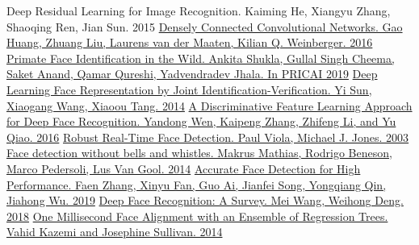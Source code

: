 \documentclass[a4paper,14pt]{extarticle}
\begin{document}
\begin{thebibliography}{0}
        {Deep Residual Learning for Image Recognition. Kaiming He, Xiangyu Zhang, Shaoqing Ren, Jian Sun. 2015}
        \hypertarget{densenet}{}
        \href{https://arxiv.org/abs/1608.06993}
        {Densely Connected Convolutional Networks. Gao Huang, Zhuang Liu, Laurens van der Maaten, Kilian Q. Weinberger. 2016}
        \hypertarget{pfid}{}
        \href{https://arxiv.org/abs/1907.02642}
        {Primate Face Identification in the Wild. Ankita Shukla, Gullal Singh Cheema, Saket Anand, Qamar Qureshi, Yadvendradev Jhala. In PRICAI 2019}
        \hypertarget{pfid2}{}
        \href{https://arxiv.org/abs/1406.4773}
        {Deep Learning Face Representation by Joint Identification-Verification. Yi Sun, Xiaogang Wang, Xiaoou Tang. 2014}
        \hypertarget{pfid3}{}
        \href{https://ydwen.github.io/papers/WenECCV16.pdf}
        {A Discriminative Feature Learning Approach
        for Deep Face Recognition. Yandong Wen, Kaipeng Zhang, Zhifeng Li, and Yu Qiao. 2016}
        \hypertarget{face_detection}{}
        \href{http://www.face-rec.org/algorithms/Boosting-Ensemble/16981346.pdf}
        {Robust Real-Time Face Detection. Paul Viola, Michael J. Jones. 2003}
        \hypertarget{face_detection2}{}
        \href{http://rodrigob.github.io/documents/2014_eccv_face_detection_with_supplementary_material.pdf}
        {Face detection without bells and whistles. Makrus Mathias, Rodrigo Beneson, Marco Pedersoli, Lus Van Gool. 2014}
        \hypertarget{face_detection3}{}
        \href{https://arxiv.org/abs/1905.01585}
        {Accurate Face Detection for High Performance. Faen Zhang, Xinyu Fan, Guo Ai, Jianfei Song, Yongqiang Qin, Jiahong Wu. 2019}
        \hypertarget{face}{}
        \href{https://arxiv.org/abs/1804.06655}
        {Deep Face Recognition: A Survey. Mei Wang, Weihong Deng. 2018}
        \hypertarget{align}{}
        \href{http://www.csc.kth.se/~vahidk/papers/KazemiCVPR14.pdf}
        {One Millisecond Face Alignment with an Ensemble of Regression Trees. Vahid Kazemi and Josephine Sullivan. 2014}
    \end{thebibliography}
\end{document}
